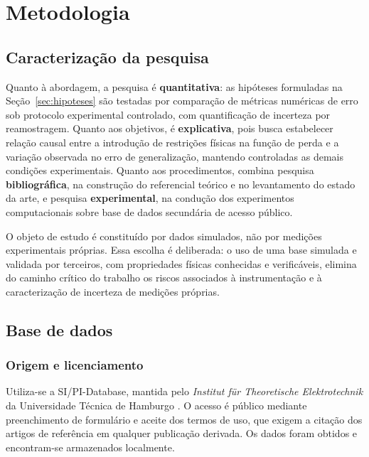 \chapter{Metodologia}
\label{cap:metodologia}

\section{Caracterização da pesquisa}
\label{sec:caracterizacao}

Quanto à abordagem, a pesquisa é \textbf{quantitativa}: as hipóteses formuladas
na Seção~\ref{sec:hipoteses} são testadas por comparação de métricas numéricas de
erro sob protocolo experimental controlado, com quantificação de incerteza por
reamostragem. Quanto aos objetivos, é \textbf{explicativa}, pois busca
estabelecer relação causal entre a introdução de restrições físicas na função de
perda e a variação observada no erro de generalização, mantendo controladas as
demais condições experimentais. Quanto aos procedimentos, combina pesquisa
\textbf{bibliográfica}, na construção do referencial teórico e no levantamento do
estado da arte, e pesquisa \textbf{experimental}, na condução dos experimentos
computacionais sobre base de dados secundária de acesso público.

O objeto de estudo é constituído por dados simulados, não por medições
experimentais próprias. Essa escolha é deliberada: o uso de uma base simulada e
validada por terceiros, com propriedades físicas conhecidas e verificáveis,
elimina do caminho crítico do trabalho os riscos associados à instrumentação e
à caracterização de incerteza de medições próprias.

\section{Base de dados}
\label{sec:dados}

\subsection{Origem e licenciamento}

Utiliza-se a SI/PI-Database, mantida pelo \textit{Institut für Theoretische
Elektrotechnik} da Universidade Técnica de Hamburgo \citep{schierholz2021,
hillebrecht2024}. O acesso é público mediante preenchimento de formulário e
aceite dos termos de uso, que exigem a citação dos artigos de referência em
qualquer publicação derivada. Os dados foram obtidos e encontram-se armazenados
localmente.

